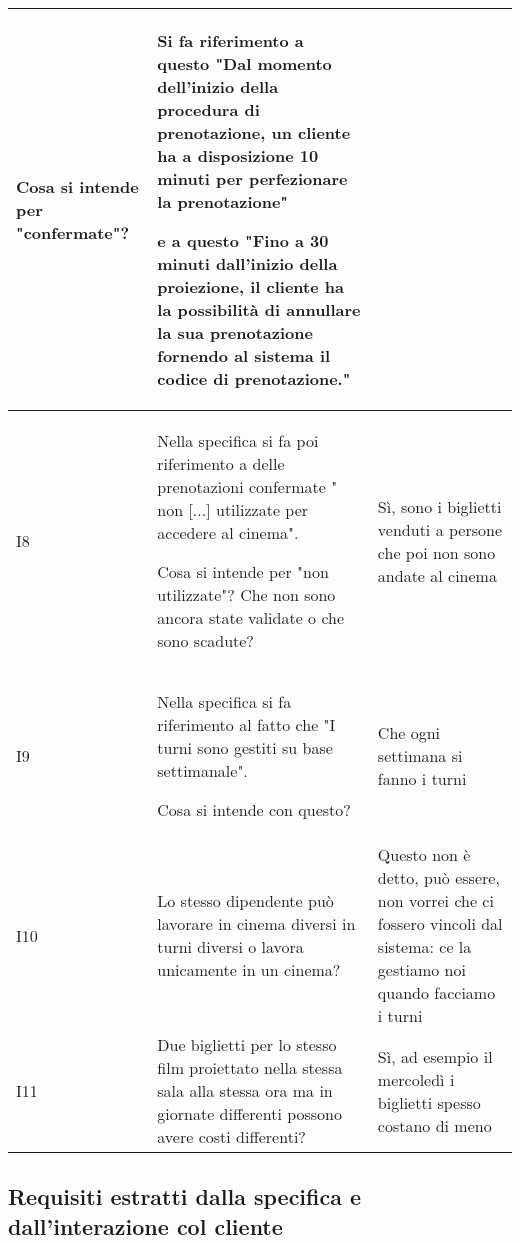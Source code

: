 \begin{longtable}{|p{1cm}|p{7.66cm}|p{7.66cm}|}
      Cosa si intende per "confermate"?                                       &
      Si fa riferimento a questo
      "Dal momento dell’inizio della procedura di prenotazione, un cliente ha
      a disposizione 10 minuti per perfezionare la prenotazione"

      e a questo "Fino a 30 minuti dall'inizio della proiezione, il cliente ha
      la possibilità di annullare la sua prenotazione fornendo al sistema il
      codice di prenotazione."
      \\\hline
      I8                                                                      &
      Nella specifica si fa poi riferimento a delle
      prenotazioni confermate " non  [...] utilizzate per accedere al cinema".

      Cosa si intende per "non utilizzate"? Che non sono ancora state
      validate o che sono scadute?                                            &
      Sì, sono i biglietti venduti a persone che poi non sono andate al cinema
      \\\hline
      I9                                                                      &
      Nella specifica si fa riferimento al fatto che
      "I turni sono gestiti su base settimanale".

      Cosa si intende con questo?                                             &
      Che ogni settimana si fanno i turni
      \\\hline
      I10                                                                     &
      Lo stesso dipendente può lavorare in cinema diversi in turni diversi o
      lavora unicamente in un cinema?                                         &
      Questo non è detto, può essere, non vorrei che ci fossero vincoli dal
      sistema: ce la gestiamo noi quando facciamo i turni
      \\\hline
      I11                                                                     &
      Due biglietti per lo stesso film proiettato nella stessa sala alla
      stessa ora ma in giornate differenti possono avere costi differenti?    &
      Sì, ad esempio il mercoledì i biglietti spesso costano di meno
      \\\hline
\end{longtable}

\pagebreak

\subsection*{Requisiti estratti dalla specifica e dall'interazione col cliente}
%
%

